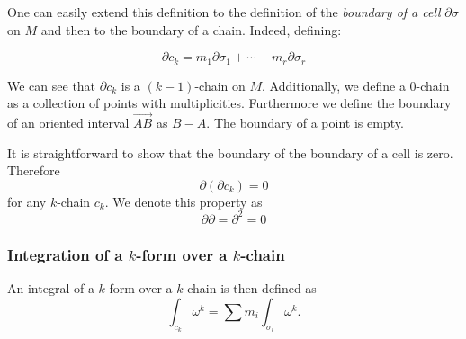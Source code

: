 One can easily extend this definition to the definition of the \textit{boundary
of a cell} $\partial\sigma$ on $M$ and then to the boundary of a chain. Indeed,
defining:
\begin{definition}
  \begin{equation}
    \partial c_k = m_1\partial\sigma_1 + \cdots + m_r\partial\sigma_r
  \end{equation}
\end{definition}
We can see that $\partial c_k$ is a $(k-1)$-chain on $M$. Additionally, we
define a 0-chain as a collection of points with multiplicities. Furthermore we
define the boundary of an oriented interval $\vec{AB}$ as $B-A$. The boundary
of a point is empty.
\par It is straightforward to show that the boundary of the boundary of a cell
is zero. Therefore 
\begin{equation}
  \partial(\partial c_k) = 0
\end{equation}
for any $k$-chain $c_k$. We denote this property as
\begin{equation}
  \partial\partial = \partial^2 = 0
\end{equation}
\subsubsection{Integration of a $k$-form over a $k$-chain}
An integral of a $k$-form over a $k$-chain is then defined as
\begin{equation}
  \int_{c_k}{\omega^k} = \sum{m_i\int_{\sigma_i}{\omega^k}}.
\end{equation}
